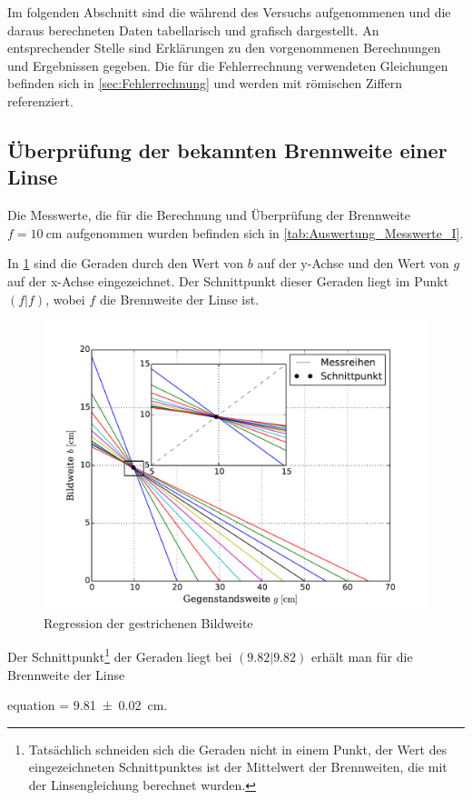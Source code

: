 Im folgenden Abschnitt sind die während des Versuchs aufgenommenen 
und die daraus berechneten Daten tabellarisch und grafisch dargestellt.
An entsprechender Stelle sind Erklärungen zu den vorgenommenen Berechnungen 
und Ergebnissen gegeben. Die für die Fehlerrechnung verwendeten Gleichungen
befinden sich in \cref{sec:Fehlerrechnung} und werden mit römischen Ziffern
referenziert.

\subsection{Überprüfung der bekannten Brennweite einer Linse}

	Die Messwerte, die für die Berechnung und Überprüfung der Brennweite $f=\SI{10}{\centi\meter}$ aufgenommen wurden 
	befinden sich in \cref{tab:Auswertung_Messwerte_I}.
	
	  			
	
	In \cref{fig:Auswertung_BekannteLinse} sind die Geraden durch den Wert von $b$ auf der y-Achse und den Wert von $g$
	auf der x-Achse eingezeichnet. Der Schnittpunkt dieser Geraden liegt im Punkt $(f|f)$, wobei $f$
	die Brennweite der Linse ist.
	  
	\begin{figure}[!h]
		\centering
		\includegraphics[scale=.7]{Grafiken/Messwerte_Bekannt.pdf}
		\caption{Regression der gestrichenen Bildweite\label{fig:Auswertung_BekannteLinse}}
	\end{figure}  
	 
	 Der Schnittpunkt\footnote{Tatsächlich schneiden sich die Geraden nicht in einem Punkt, der Wert
	 des eingezeichneten Schnittpunktes ist der Mittelwert der Brennweiten, die mit der Linsengleichung berechnet
	 wurden.} der Geraden liegt bei $(9.82|9.82)$ erhält man für die Brennweite der Linse
	 \begin{empheq}{equation}
		\label{val:Auswertung_Bekannt}
		 = \SI{9.81(2)}{\centi\meter}.
	 \end{empheq}
	 

